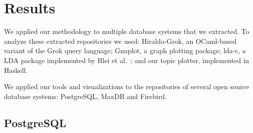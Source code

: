 \documentclass[times, 10pt,twocolumn]{article}
\newcommand{\shrinkit}{\vspace*{-.3em}}
\begin{document}















\shrinkit
\section{Results}
\shrinkit

We applied our methodology to multiple database systems that we
extracted.  To analyze these extracted repositories we used:
Hiraldo-Grok, an OCaml-based variant of the Grok query language;
Gnuplot, a graph plotting package; lda-c, a LDA package implemented by
Blei et al.~\cite{944937}; and our topic plotter, implemented in
Haskell.

We applied our tools and visualizations to the repositories of several
open source database systems: PostgreSQL, MaxDB and Firebird.





\shrinkit
\subsection{PostgreSQL}
\shrinkit
\end{document}
